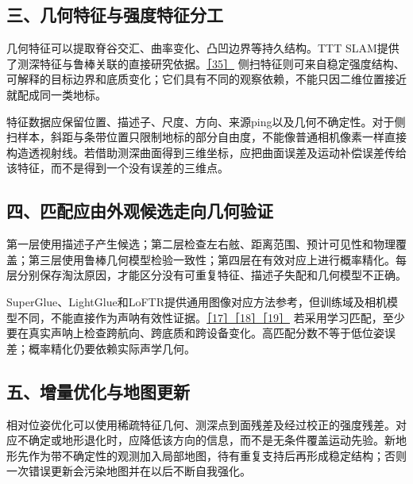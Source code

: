 \hypertarget{ux4e09ux51e0ux4f55ux7279ux5f81ux4e0eux5f3aux5ea6ux7279ux5f81ux5206ux5de5}{%
\subsection{三、几何特征与强度特征分工}\label{ux4e09ux51e0ux4f55ux7279ux5f81ux4e0eux5f3aux5ea6ux7279ux5f81ux5206ux5de5}}

几何特征可以提取脊谷交汇、曲率变化、凸凹边界等持久结构。TTT SLAM提供了测深特征与鲁棒关联的直接研究依据。\href{https://www.sciencedirect.com/science/article/pii/S0029801824001148}{［35］} 侧扫特征则可来自稳定强度结构、可解释的目标边界和底质变化；它们具有不同的观察依赖，不能只因二维位置接近就配成同一类地标。

特征数据应保留位置、描述子、尺度、方向、来源ping以及几何不确定性。对于侧扫样本，斜距与条带位置只限制地标的部分自由度，不能像普通相机像素一样直接构造透视射线。若借助测深曲面得到三维坐标，应把曲面误差及运动补偿误差传给该特征，而不是得到一个没有误差的三维点。

\hypertarget{ux56dbux5339ux914dux5e94ux7531ux5916ux89c2ux5019ux9009ux8d70ux5411ux51e0ux4f55ux9a8cux8bc1}{%
\subsection{四、匹配应由外观候选走向几何验证}\label{ux56dbux5339ux914dux5e94ux7531ux5916ux89c2ux5019ux9009ux8d70ux5411ux51e0ux4f55ux9a8cux8bc1}}

第一层使用描述子产生候选；第二层检查左右舷、距离范围、预计可见性和物理覆盖；第三层使用鲁棒几何模型检验一致性；第四层在有效对应上进行概率精化。每层分别保存淘汰原因，才能区分没有可重复特征、描述子失配和几何模型不正确。

SuperGlue、LightGlue和LoFTR提供通用图像对应方法参考，但训练域及相机模型不同，不能直接作为声呐有效性证据。\href{https://arxiv.org/abs/1911.11763}{［17］}\href{https://arxiv.org/abs/2306.13643}{［18］}\href{https://arxiv.org/abs/2104.00680}{［19］} 若采用学习匹配，至少要在真实声呐上检查跨航向、跨底质和跨设备变化。高匹配分数不等于低位姿误差；概率精化仍要依赖实际声学几何。

\hypertarget{ux4e94ux589eux91cfux4f18ux5316ux4e0eux5730ux56feux66f4ux65b0}{%
\subsection{五、增量优化与地图更新}\label{ux4e94ux589eux91cfux4f18ux5316ux4e0eux5730ux56feux66f4ux65b0}}

相对位姿优化可以使用稀疏特征几何、测深点到面残差及经过校正的强度残差。对应不确定或地形退化时，应降低该方向的信息，而不是无条件覆盖运动先验。新地形先作为带不确定性的观测加入局部地图，待有重复支持后再形成稳定结构；否则一次错误更新会污染地图并在以后不断自我强化。

